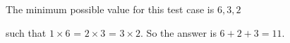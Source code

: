 The minimum possible value for this test case is $6,3,2$

such that $1\times 6$ = $2 \times 3$ = $3\times 2$. So the answer is $6+2+3=11$.
